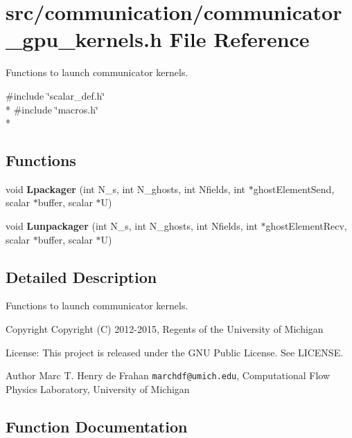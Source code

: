 \section{src/communication/communicator\-\_\-gpu\-\_\-kernels.h File Reference}
\label{communicator__gpu__kernels_8h}


Functions to launch communicator kernels.  


{\ttfamily \#include \char`\"{}scalar\-\_\-def.\-h\char`\"{}}\\*
{\ttfamily \#include \char`\"{}macros.\-h\char`\"{}}\\*
\subsection*{Functions}
\begin{DoxyCompactItemize}
\item 
void {\bf Lpackager} (int N\-\_\-s, int N\-\_\-ghosts, int Nfields, int $\ast$ghost\-Element\-Send, scalar $\ast$buffer, scalar $\ast$U)
\item 
void {\bf Lunpackager} (int N\-\_\-s, int N\-\_\-ghosts, int Nfields, int $\ast$ghost\-Element\-Recv, scalar $\ast$buffer, scalar $\ast$U)
\end{DoxyCompactItemize}


\subsection{Detailed Description}
Functions to launch communicator kernels. \begin{DoxyCopyright}{Copyright}
Copyright (C) 2012-\/2015, Regents of the University of Michigan 
\end{DoxyCopyright}
\begin{DoxyParagraph}{License\-:}
This project is released under the G\-N\-U Public License. See L\-I\-C\-E\-N\-S\-E. 
\end{DoxyParagraph}
\begin{DoxyAuthor}{Author}
Marc T. Henry de Frahan {\tt marchdf@umich.\-edu}, Computational Flow Physics Laboratory, University of Michigan 
\end{DoxyAuthor}


\subsection{Function Documentation}
